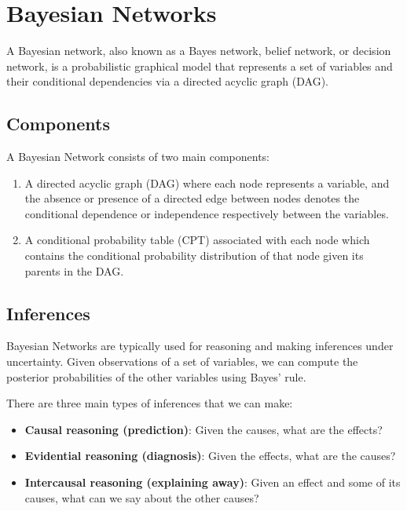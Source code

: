 \chapter{Bayesian Networks}

A Bayesian network, also known as a Bayes network, belief network, or decision network, is a probabilistic graphical model that represents a set of variables and their conditional dependencies via a directed acyclic graph (DAG).

\section{Components}

A Bayesian Network consists of two main components:

\begin{enumerate}
    \item A directed acyclic graph (DAG) where each node represents a variable, and the absence or presence of a directed edge between nodes denotes the conditional dependence or independence respectively between the variables.
    \item A conditional probability table (CPT) associated with each node which contains the conditional probability distribution of that node given its parents in the DAG.
\end{enumerate}

\section{Inferences}

Bayesian Networks are typically used for reasoning and making inferences under uncertainty. Given observations of a set of variables, we can compute the posterior probabilities of the other variables using Bayes' rule. 

There are three main types of inferences that we can make:

\begin{itemize}
    \item \textbf{Causal reasoning (prediction)}: Given the causes, what are the effects?
    \item \textbf{Evidential reasoning (diagnosis)}: Given the effects, what are the causes?
    \item \textbf{Intercausal reasoning (explaining away)}: Given an effect and some of its causes, what can we say about the other causes?
\end{itemize}

